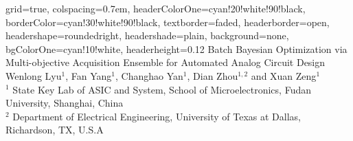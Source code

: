 \documentclass[landscape,paperwidth=200cm, paperheight=120cm,fontscale=0.25, margin=5cm]{baposter}
\begin{document}
\begin{poster}{
 grid=true,
 colspacing=0.7em,
 headerColorOne=cyan!20!white!90!black,
 borderColor=cyan!30!white!90!black,
 textborder=faded,
 headerborder=open,
 headershape=roundedright,
 headershade=plain,
 background=none,
 bgColorOne=cyan!10!white,
 headerheight=0.12\textheight}
 {
 }
 {Batch Bayesian Optimization via Multi-objective Acquisition Ensemble for Automated Analog Circuit Design}
    {
        \vskip 0.15in
        Wenlong Lyu$^1$, Fan Yang$^1$, Changhao Yan$^1$, Dian Zhou$^{1, 2}$ and Xuan Zeng$^1$\\
        $^1$ State Key Lab of ASIC and System, School of Microelectronics, Fudan University, Shanghai, China \\
        $^2$ Department of Electrical Engineering, University of Texas at Dallas, Richardson, TX, U.S.A
    }
 {
 }



\end{poster}
\end{document}

